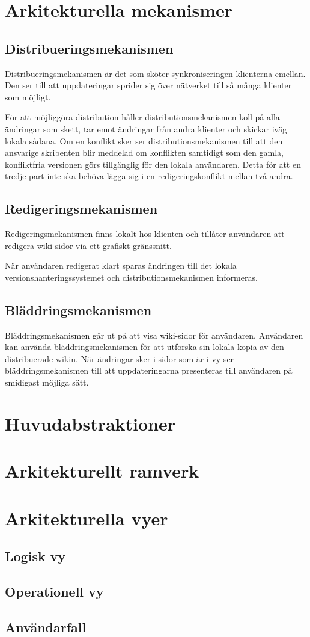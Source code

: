 \section{Arkitekturella mekanismer}
\subsection{Distribueringsmekanismen}
Distribueringsmekanismen är det som sköter synkroniseringen klienterna emellan. Den ser till att uppdateringar sprider sig över nätverket till så många klienter som möjligt.

För att möjliggöra distribution håller distributionsmekanismen koll på alla ändringar som skett, tar emot ändringar från andra klienter och skickar iväg lokala sådana. Om en konflikt sker ser distributionsmekanismen till att den ansvarige skribenten blir meddelad om konflikten samtidigt som den gamla, konfliktfria versionen görs tillgänglig för den lokala användaren. Detta för att en tredje part inte ska behöva lägga sig i en redigeringskonflikt mellan två andra.
\subsection{Redigeringsmekanismen}
Redigeringsmekanismen finns lokalt hos klienten och tillåter användaren att redigera wiki-sidor via ett grafiskt gränssnitt.

När användaren redigerat klart sparas ändringen till det lokala versionshanteringssystemet och distributionsmekanismen informeras.
\subsection{Bläddringsmekanismen}
Bläddringsmekanismen går ut på att visa wiki-sidor för användaren. Användaren kan använda bläddringsmekanismen för att utforska sin lokala kopia av den distribuerade wikin. När ändringar sker i sidor som är i vy ser bläddringsmekanismen till att uppdateringarna presenteras till användaren på smidigast möjliga sätt.
\section{Huvudabstraktioner}
\section{Arkitekturellt ramverk}
\section{Arkitekturella vyer}
\subsection{Logisk vy}
\subsection{Operationell vy}
\subsection{Användarfall}

